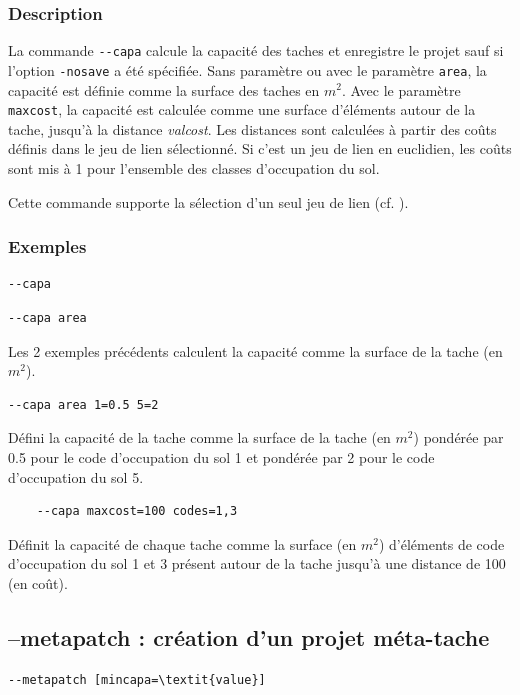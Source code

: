 \documentclass[a4paper,10pt]{report}
\begin{document}
\subsubsection{Description}
La commande \verb|--capa| calcule la capacité des taches et enregistre le projet sauf si l'option \verb|-nosave| a été spécifiée. Sans paramètre ou avec le paramètre \verb|area|, la capacité est définie comme la surface des taches en $m^2$. Avec le paramètre \verb|maxcost|, la capacité est calculée comme une surface d'éléments autour de la tache, jusqu'à la distance \textit{valcost}.
Les distances sont calculées à partir des coûts définis dans le jeu de lien sélectionné. Si c'est un jeu de lien en euclidien, les coûts sont mis à 1 pour l'ensemble des classes d'occupation du sol.

Cette commande supporte la sélection d'un seul jeu de lien (cf. ).

\subsubsection{Exemples}
\begin{Verbatim}
--capa
\end{Verbatim}
\begin{Verbatim}
--capa area
\end{Verbatim}
Les 2 exemples précédents calculent la capacité comme la surface de la tache (en $m^2$).

\begin{Verbatim}
--capa area 1=0.5 5=2
\end{Verbatim}
Défini la capacité de la tache comme la surface de la tache (en $m^2$) pondérée par 0.5 pour le code d'occupation du sol 1 et pondérée par 2 pour le code d'occupation du sol 5.

\begin{Verbatim}
	--capa maxcost=100 codes=1,3
\end{Verbatim}
Définit la capacité de chaque tache comme la surface (en $m^2$) d'éléments de code d'occupation du sol 1 et 3 présent autour de la tache jusqu'à une distance de 100 (en coût). 


\subsection{--metapatch : création d'un projet méta-tache}
\begin{Verbatim}[commandchars=\\\{\}]
--metapatch [mincapa=\textit{value}]
\end{Verbatim}
\end{document}
